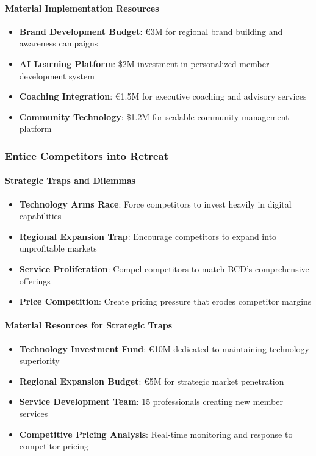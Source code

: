 \paragraph{Material Implementation Resources}
\begin{itemize}
    \item \textbf{Brand Development Budget}: €3M for regional brand building and awareness campaigns
    \item \textbf{AI Learning Platform}: \$2M investment in personalized member development system
    \item \textbf{Coaching Integration}: €1.5M for executive coaching and advisory services
    \item \textbf{Community Technology}: \$1.2M for scalable community management platform
\end{itemize}

\subsubsection{Entice Competitors into Retreat}

\paragraph{Strategic Traps and Dilemmas}
\begin{itemize}
    \item \textbf{Technology Arms Race}: Force competitors to invest heavily in digital capabilities
    \item \textbf{Regional Expansion Trap}: Encourage competitors to expand into unprofitable markets
    \item \textbf{Service Proliferation}: Compel competitors to match BCD's comprehensive offerings
    \item \textbf{Price Competition}: Create pricing pressure that erodes competitor margins
\end{itemize}

\paragraph{Material Resources for Strategic Traps}
\begin{itemize}
    \item \textbf{Technology Investment Fund}: €10M dedicated to maintaining technology superiority
    \item \textbf{Regional Expansion Budget}: €5M for strategic market penetration
    \item \textbf{Service Development Team}: 15 professionals creating new member services
    \item \textbf{Competitive Pricing Analysis}: Real-time monitoring and response to competitor pricing
\end{itemize}

